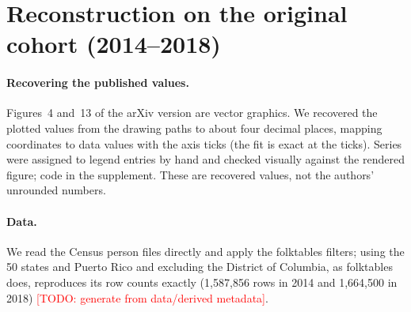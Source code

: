 \documentclass[10pt]{article}
\newcommand{\todo}[1]{\textcolor{red}{[TODO: #1]}}
\begin{document}
\section{Reconstruction on the original cohort (2014--2018)}
\label{sec:reconstruction}

\paragraph{Recovering the published values.}
Figures~4 and~13 of the arXiv version are vector graphics.
We recovered the plotted values from the drawing paths to about four decimal places, mapping coordinates to data values with the axis ticks (the fit is exact at the ticks). Series were assigned to legend entries by hand and checked visually against the rendered figure; code in the supplement. These are recovered values, not the authors' unrounded numbers.

\paragraph{Data.}
We read the Census person files directly and apply the folktables filters; using the 50 states and Puerto Rico and excluding the District of Columbia, as folktables does, reproduces its row counts exactly (1{,}587{,}856 rows in 2014 and 1{,}664{,}500 in 2018) \todo{generate from data/derived metadata}.
\end{document}
